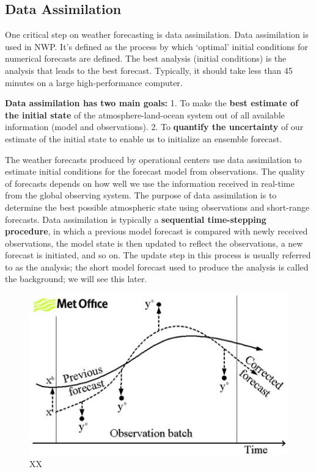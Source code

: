 \documentclass[12pt,oneside]{book}
\begin{document}
\subsection{Data Assimilation}\label{data-assimilation}

One critical step on weather forecasting is data assimilation. Data
assimilation is used in NWP. It's defined as the process by which
`optimal' initial conditions for numerical forecasts are defined. The
best analysis (initial conditions) is the analysis that leads to the
best forecast. Typically, it should take less than 45 minutes on a large
high-performance computer.

\textbf{Data assimilation has two main goals:} 1. To make the
\textbf{best estimate of the initial state} of the atmosphere-land-ocean
system out of all available information (model and observations). 2. To
\textbf{quantify the uncertainty} of our estimate of the initial state
to enable us to initialize an ensemble forecast.

The weather forecasts produced by operational centers use data
assimilation to estimate initial conditions for the forecast model from
observations. The quality of forecasts depends on how well we use the
information received in real-time from the global observing system. The
purpose of data assimilation is to determine the best possible
atmospheric state using observations and short-range forecasts. Data
assimilation is typically a \textbf{sequential time-stepping procedure},
in which a previous model forecast is compared with newly received
observations, the model state is then updated to reflect the
observations, a new forecast is initiated, and so on. The update step in
this process is usually referred to as the analysis; the short model
forecast used to produce the analysis is called the background; we will
see this later.

\begin{figure}

{\centering \includegraphics[width=0.8\linewidth]{figures/Figure73} 

}

\caption{XX}\label{fig:DataAssimilation}
\end{figure}
\end{document}

